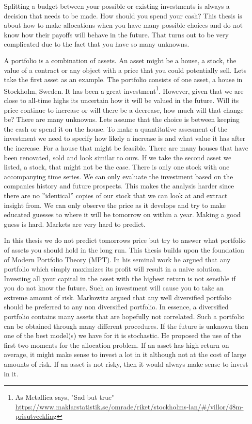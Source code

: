 Splitting a budget between your possible or existing investments is always a decision that needs to be made.
How should you spend your cash?
This thesis is about how to make allocations when you have many possible choices and do not know how their payoffs will behave in the future.
That turns out to be very complicated due to the fact that you have so many unknowns.

A portfolio is a combination of assets.
An asset might be a house, a stock, the value of a contract or any object with a price that you could potentially sell.
Lets take the first asset as an example. 
The portfolio consists of one asset, a house in Stockholm, Sweden.
It has been a great investment\footnote{As Metallica says, "Sad but true" \url{https://www.maklarstatistik.se/omrade/riket/stockholms-lan/\#/villor/48m-prisutveckling}}.
However, given that we are close to all-time highs its uncertain how it will be valued in the future.
Will its price continue to increase or will there be a decrease, how much will that change be?
There are many unknowns.
Lets assume that the choice is between keeping the cash or spend it on the house.
To make a quantitative assesment of the investment we need to specify how likely a increase is and what value it has after the increase.
For a house that might be feasible.
There are many houses that have been renovated, sold and look similar to ours.
If we take the second asset we listed, a stock, that might not be the case.
There is only one stock with one accompanying time series.
We can only evaluate the investment based on the companies history and future prospects.
This makes the analysis harder since there are no ''identical'' copies of our stock that we can look at and extract insight from.
We can only observe the price as it develops and try to make educated guesses to where it will be tomorrow on within a year.
Making a good guess is hard.
Markets are very hard to predict.

In this thesis we do not predict tomorrows price but try to answer what portfolio of assets you should hold in the long run.
This thesis builds upon the foundation of \citet{markowitz1959portfolio} Modern Portfolio Theory (MPT).
In his seminal work he argued that any portfolio which simply maximizes its profit will result in a naive solution.
Investing all your capital in the asset with the highest return is not sensible if you do not know the future.
Such an investment will cause you to take an extreme amount of risk. 
Markowitz argued that any well diversified portfolio should be preferred to any non diversified portfolio. 
In essence, a diversified portfolio contains many assets that are hopefully not correlated.
Such a portfolio can be obtained through many different procedures.
If the future is unknown then one of the best model(s) we have for it is stochastic.
He proposed the use of the first two moments for the allocation problem.
If an asset has high return on average, it might make sense to invest a lot in it although not at the cost of large amounts of risk. 
If an asset is not risky, then it would always make sense to invest in it.


